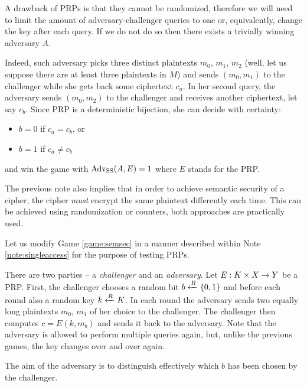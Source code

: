 \begin{note}
\label{note:singleaccess}
	A drawback of PRPs is that they cannot be randomized, therefore we will need to limit the amount of adversary-challenger queries to one or, equivalently, change the key after each query. If we do not do so then there exists a trivially winning adversary $A$.
	
	Indeed, such adversary picks three distinct plaintexts $m_0$, $m_1$, $m_2$ (well, let us suppose there are at least three plaintexts in $M$) and sends $(m_0,m_1)$ to the challenger while she gets back some ciphertext $c_a$. In her second query, the adversary sends $(m_0,m_2)$ to the challenger and receives another ciphertext, let say $c_b$. Since PRP is a deterministic bijection, she can decide with certainty:
	\begin{itemize}
		\item $b=0$ if $c_a = c_b$, or
		\item $b=1$ if $c_a \neq c_b$
	\end{itemize}
	and win the game with $\operatorname*{Adv_{SS}}(A,E) = 1$ where $E$ stands for the PRP.
\end{note}

\begin{note}
\label{note:randomize}
	The previous note also implies that in order to achieve semantic security of a cipher, the cipher {\em must} encrypt the same plaintext differently each time. This can be achieved using randomization or counters, both approaches are practically used.
\end{note}

Let us modify Game \ref{game:semsec} in a manner described within Note \ref{note:singleaccess} for the purpose of testing PRPs.

\begin{game}
\label{game:semsecprp}
	There are two parties -- a {\em challenger} and an {\em adversary}. Let $E:K\times X\rightarrow Y$ be a PRP. First, the challenger chooses a random bit $b\xleftarrow{R}\{0,1\}$ and before each round also a random key $k\xleftarrow{R} K$. In each round the adversary sends two equally long plaintexts $m_0$, $m_1$ of her choice to the challenger. The challenger then computes $c = E(k,m_b)$ and sends it back to the adversary. Note that the adversary is allowed to perform multiple queries again, but, unlike the previous games, the key changes over and over again.
	
	The aim of the adversary is to distinguish effectively which $b$ has been chosen by the challenger.
\end{game}

